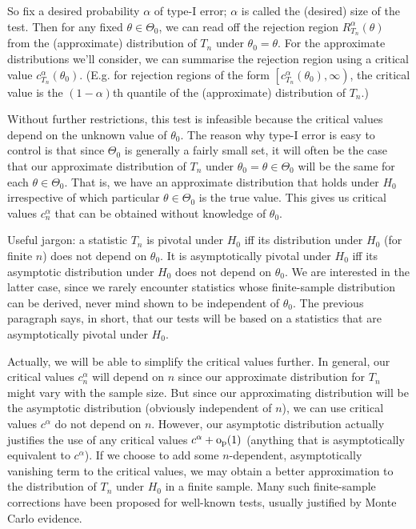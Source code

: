 \documentclass[11pt,letterpaper,reqno,oneside]{article}
\begin{document}
So fix a desired probability $\alpha$ of type-I error; $\alpha$ is called the (desired) size of the test. Then for any fixed $\theta \in \Theta_0$, we can read off the rejection region $R^\alpha_{T_n}(\theta)$ from the (approximate) distribution of $T_n$ under $\theta_0=\theta$. For the approximate distributions we'll consider, we can summarise the rejection region using a critical value $c^\alpha_{T_n}(\theta_0)$. (E.g. for rejection regions of the form $\left[ c^\alpha_{T_n}(\theta_0), \infty \right)$, the critical value is the $(1-\alpha)$th quantile of the (approximate) distribution of $T_n$.)

Without further restrictions, this test is infeasible because the critical values depend on the unknown value of $\theta_0$. The reason why type-I error is easy to control is that since $\Theta_0$ is generally a fairly small set, it will often be the case that our approximate distribution of $T_n$ under $\theta_0 = \theta \in \Theta_0$ will be the same for each $\theta \in \Theta_0$. That is, we have an approximate distribution that holds under $H_0$ irrespective of which particular $\theta \in \Theta_0$ is the true value. This gives us critical values $c_n^\alpha$ that can be obtained without knowledge of $\theta_0$.

Useful jargon: a statistic $T_n$ is pivotal under $H_0$ iff its distribution under $H_0$ (for finite $n$) does not depend on $\theta_0$. It is asymptotically pivotal under $H_0$ iff its asymptotic distribution under $H_0$ does not depend on $\theta_0$. We are interested in the latter case, since we rarely encounter statistics whose finite-sample distribution can be derived, never mind shown to be independent of $\theta_0$. The previous paragraph says, in short, that our tests will be based on a statistics that are asymptotically pivotal under $H_0$.

Actually, we will be able to simplify the critical values further. In general, our critical values $c_n^\alpha$ will depend on $n$ since our approximate distribution for $T_n$ might vary with the sample size. But since our approximating distribution will be the asymptotic distribution (obviously independent of $n$), we can use critical values $c^\alpha$ do not depend on $n$. However, our asymptotic distribution actually justifies the use of any critical values $c^\alpha + \mathrm{o}_{\mathrm{p}}(1)$ (anything that is asymptotically equivalent to $c^\alpha$). If we choose to add some $n$-dependent, asymptotically vanishing term to the critical values, we may obtain a better approximation to the distribution of $T_n$ under $H_0$ in a finite sample. Many such finite-sample corrections have been proposed for well-known tests, usually justified by Monte Carlo evidence.
\end{document}
